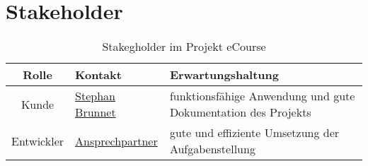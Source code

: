 \section{Stakeholder}

\begin{table}[H]
\centering
\begin{tabularx}{\textwidth}[H]{|c|X|X|}
\hline
Rolle &	Kontakt & Erwartungshaltung\\
\hline
Kunde & \href{mailto:Stephan.Brunnet@softwareinmotion.de}{Stephan Brunnet}  & funktionsfähige Anwendung und gute Dokumentation des Projekts \\
\hline
Entwickler & \href{mailto:inf19109@lehre.dhbw-stuttgart.de}{Ansprechpartner} & gute und effiziente Umsetzung der Aufgabenstellung\\
\hline
\end{tabularx}
\caption{Stakegholder im Projekt eCourse}
\label{tab:Stakeholder}
\end{table}


